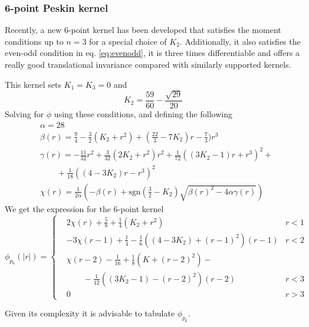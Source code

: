 \documentclass[ twoside,openright,titlepage,numbers=noenddot,%
headinclude,footinclude,cleardoublepage=empty,abstract=on,
BCOR=5mm,paper=a4,fontsize=11pt, dvipsnames
]{scrreprt}
\begin{document}
\subsubsection*{6-point Peskin kernel}
Recently, a new 6-point kernel has been developed that satisfies the moment conditions up to $n=3$ for a special choice of $K_2$\cite{Bao2016}. Additionally, it also satisfies the even-odd condition in eq. \eqref{eq:evenodd}, it is three times differentiable and offers a really good translational invariance compared with similarly supported kernels.

This kernel sets $K_1= K_3 = 0$ and
\begin{equation}
K_2 = \frac{59}{60} - \frac{\sqrt{29}}{20}
\end{equation}
Solving for $\phi$ using these conditions, and defining the following
\begin{equation}
  \begin{aligned}
    &\alpha = 28\\
    &\beta(r) = \frac{9}{4} - \frac{3}{2} (K_2 + r^2) + (\frac{22}{3}-7K_2)r - \frac{7}{3})r^3\\
    &\gamma(r) = -\frac{11}{32}r^2 + \frac{3}{32}(2K_2+r^2)r^2 +
    \frac{1}{72}\left((3K_2-1)r+r^3\right)^2 +\\
    &\qquad+\frac{1}{18}\left((4-3K_2)r -r^3\right)^2\\
    &\chi(r) = \frac{1}{2\alpha}\left( -\beta(r) + \textrm{sgn}(\frac{3}{2} - K_2)\sqrt{\beta(r)^2 - 4\alpha\gamma(r)}\right)
\end{aligned}
\end{equation}
We get the expression for the 6-point kernel
\begin{equation}
  \label{eq:peskin6}
  \phi_{p_6}(|r|) =  \left\{
    \begin{aligned}
      & 2\chi(r) + \frac{5}{8} + \frac{1}{4}(K_2 + r^2)& r < 1\\[8pt]
      & -3\chi(r-1) + \frac{1}{4} - \frac{1}{6}\left((4-3K_2) + (r-1)^2\right)(r-1) & r < 2\\[8pt]
      & \chi(r-2) - \frac{1}{16} + \frac{1}{8}\left(K+(r-2)^2\right) - \\
      &\qquad-\frac{1}{12}\left((3K_2-1) - (r-2)^2\right)(r-2)& r<3\\[8pt]
      &0 &r>3
  \end{aligned}\right.
\end{equation}

Given its complexity it is advisable to tabulate $\phi_{p_6}$.
\end{document}
